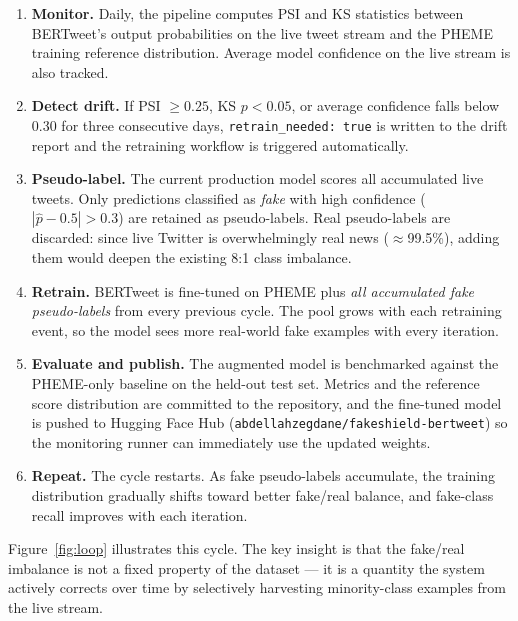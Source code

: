 \documentclass[sigconf]{acmart}
\begin{document}
\begin{enumerate}
  \item \textbf{Monitor.} Daily, the pipeline computes PSI and KS statistics between
        BERTweet's output probabilities on the live tweet stream and the PHEME training
        reference distribution. Average model confidence on the live stream is also tracked.
  \item \textbf{Detect drift.} If PSI $\geq 0.25$, KS $p < 0.05$, or average confidence
        falls below 0.30 for three consecutive days, \texttt{retrain\_needed: true} is
        written to the drift report and the retraining workflow is triggered automatically.
  \item \textbf{Pseudo-label.} The current production model scores all accumulated live
        tweets. Only predictions classified as \textit{fake} with high confidence
        ($|\hat{p} - 0.5| > 0.3$) are retained as pseudo-labels. Real pseudo-labels are
        discarded: since live Twitter is overwhelmingly real news ($\approx$99.5\%),
        adding them would deepen the existing 8:1 class imbalance.
  \item \textbf{Retrain.} BERTweet is fine-tuned on PHEME plus \textit{all accumulated
        fake pseudo-labels} from every previous cycle. The pool grows with each retraining
        event, so the model sees more real-world fake examples with every iteration.
  \item \textbf{Evaluate and publish.} The augmented model is benchmarked against the
        PHEME-only baseline on the held-out test set. Metrics and the reference score
        distribution are committed to the repository, and the fine-tuned model is pushed
        to Hugging Face Hub (\texttt{abdellahzegdane/fakeshield-bertweet}) so the
        monitoring runner can immediately use the updated weights.
  \item \textbf{Repeat.} The cycle restarts. As fake pseudo-labels accumulate, the
        training distribution gradually shifts toward better fake/real balance, and
        fake-class recall improves with each iteration.
\end{enumerate}

Figure~\ref{fig:loop} illustrates this cycle. The key insight is that the fake/real
imbalance is not a fixed property of the dataset — it is a quantity the system actively
corrects over time by selectively harvesting minority-class examples from the live stream.
\end{document}
